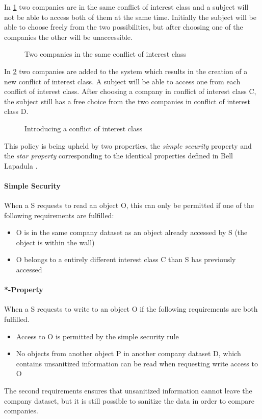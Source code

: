 In \cref{conflict} two companies are in the same conflict of interest class and a subject will not be able to access both of them at the same time.
Initially the subject will be able to choose freely from the two possibilities, but after choosing one of the companies the other will be unaccessible.

\begin{figure}[h]
  \centering
\resizebox{0.3\textwidth}{!}{  
  
  }
  \caption{Two companies in the same conflict of interest class}
  \label{conflict}
\end{figure}

In \cref{conflict2} two companies are added to the system which results in the creation of a new conflict of interest class.
A subject will be able to access one from each conflict of interest class.
After choosing a company in conflict of interest class C, the subject still has a free choice from the two companies in conflict of interest class D.

\begin{figure}[h]
  \centering
  \resizebox{0.8\textwidth}{!}{
    
    }
  \caption{Introducing a conflict of interest class}
  \label{conflict2}
\end{figure}
This policy is being upheld by two properties, the \emph{simple security} property and the \emph{star property} corresponding to the identical properties defined in Bell Lapadula .

\paragraph{Simple Security}

When a \principal{} S requests to read an object O, this can only be permitted if one of the following requirements are fulfilled:

\begin{itemize}
\item O is in the same company dataset as an object already accessed by S (the object is within the wall)
\item O belongs to a entirely different interest class C than S has previously accessed
\end{itemize}

\paragraph{*-Property}

When a \principal{} S requests to write to an object O if the following requirements are both fulfilled.

\begin{itemize}
\item Access to O is permitted by the simple security rule
\item No objects from another object P in another company dataset D, which contains unsanitized information can be read when requesting write access to O
\end{itemize}

The second requirements ensures that unsanitized information cannot leave the company dataset, but it is still possible to sanitize the data in order to compare companies.
